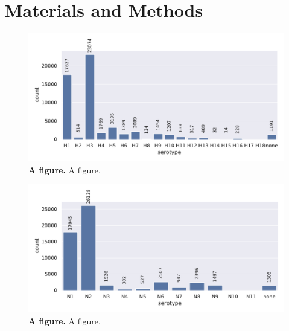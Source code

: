 \chapter{Materials and Methods} \label{chap:2}

\begin{figure}[!hbt]
    \includegraphics[width=\dimexpr\textwidth-2\fboxsep-2\fboxrule,fbox]{PCA/Data_Overview_Segment_4_H.pdf}
    \caption[A figure]{\textbf{A figure.} A figure.}
    \label{fig:2.0.1}
\end{figure}

\begin{figure}[!hbt]
    \includegraphics[width=\dimexpr\textwidth-2\fboxsep-2\fboxrule,fbox]{PCA/Data_Overview_Segment_6_N.pdf}
    \caption[A figure]{\textbf{A figure.} A figure.}
    \label{fig:2.0.2}
\end{figure}











